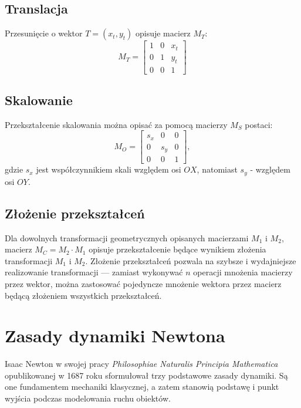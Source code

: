 \subsection{Translacja}
Przesunięcie o wektor $T = (x_t, y_t) $ opisuje macierz $M_T$:
\begin{equation}
M_T = \left[ \begin{array}{ccc}
1 & 0 & x_t \\
0 & 1 & y_t \\
0 & 0 & 1
\end{array} \right]
\label{eq:macierz-translacja}
\end{equation}

\subsection{Skalowanie}
Przekształcenie skalowania można opisać za pomocą macierzy $M_S$ postaci:
\begin{equation}
M_O = \left[ \begin{array}{ccc}
s_x & 0 & 0 \\
0 & s_y & 0 \\
0 & 0 & 1
\end{array} \right], 
\label{eq:macierz-skalowanie}
\end{equation}
gdzie $s_x$ jest współczynnikiem skali względem osi $OX$, natomiast $s_y$ - względem osi $OY$. 

\subsection{Złożenie przekształceń}
Dla dowolnych transformacji geometrycznych opisanych macierzami $M_1$ i $M_2$, macierz $M_C = M_2 \cdot M_1 $ opisuje przekształcenie będące wynikiem złożenia transformacji $M_1$ i $M_2$. Złożenie przekształceń pozwala na szybsze i wydajniejsze realizowanie transformacji --- zamiast wykonywać $n$ operacji mnożenia macierzy przez wektor, można zastosować pojedyncze mnożenie wektora przez macierz będącą złożeniem wszystkich przekształceń.
\label{part:zlozenie-przeksztalcen}

\section{Zasady dynamiki Newtona}
\label{part:zasadynewtona}
Isaac Newton w swojej pracy \textit{Philosophiae Naturalis Principia Mathematica} opublikowanej w 1687 roku sformułował trzy podstawowe zasady dynamiki. Są one fundamentem mechaniki klasycznej, a zatem stanowią podstawę i punkt wyjścia podczas modelowania ruchu obiektów.

